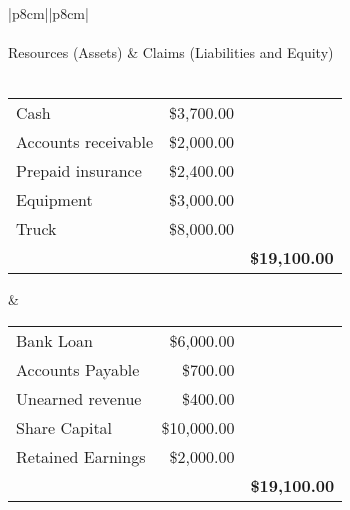 
\newpage
\begin{center}
\begin{tabular}{ |p{8cm}||p{8cm}|  }
    \hline
     \\
    \hline
    \\
    Resources (Assets) & Claims (Liabilities and Equity) \\ \\ 
    \begin{tabular}{p{4cm} r r}
Cash & \$3,700.00 \\
Accounts receivable & \$2,000.00 \\
Prepaid insurance & \$2,400.00 \\
Equipment & \$3,000.00 \\
Truck & \$8,000.00 \\

        & & \textbf{\$19,100.00}
    \end{tabular}
    &
    \begin{tabular}{p{4cm} r r}
Bank Loan & \$6,000.00 \\
Accounts Payable & \$700.00 \\
Unearned revenue & \$400.00 \\
Share Capital & \$10,000.00 \\
Retained Earnings & \$2,000.00 \\

        & & \textbf{\$19,100.00}
    \end{tabular} \\
    \hline
\end{tabular}
\end{center}
